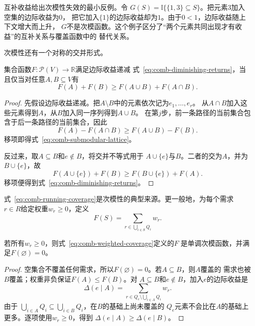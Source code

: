 互补收益给出次模性失效的最小反例。令
$G(S)=\mathbb{I}\{\{1,3\}\subseteq S\}$。把元素$3$加入空集的边际收益为$0$，
把它加入$\{1\}$的边际收益却为$1$。由于$0<1$，边际收益随上下文增大而上升，
$G$不是次模函数。这个例子区分了“两个元素共同出现才有收益”的互补关系与覆盖函数中的
替代关系。

次模性还有一个对称的交并形式。

\begin{theorem}[次模性的两个等价定义]
\label{thm:comb-submodular-equivalence}
集合函数$F:\mathcal{P}(V)\to\mathbb{R}$满足边际收益递减
式~\eqref{eq:comb-diminishing-returns}，当且仅当对任意$A,B\subseteq V$有
\begin{equation}
  F(A)+F(B)\geq F(A\cup B)+F(A\cap B).
  \label{eq:comb-submodular-lattice}
\end{equation}
\end{theorem}

\begin{proof}
先假设边际收益递减。把$A\setminus B$中的元素依次记为$e_1,\ldots,e_r$。
从$A\cap B$加入这些元素得到$A$，从$B$加入同一序列得到$A\cup B$。
在第$j$步，前一条路径的当前集合包含于后一条路径的当前集合，因此
\[
  F(A)-F(A\cap B)
  \geq F(A\cup B)-F(B).
\]
移项即得式~\eqref{eq:comb-submodular-lattice}。

反过来，取$A\subseteq B$和$e\notin B$，将交并不等式用于
$A\cup\{e\}$与$B$。二者的交为$A$，并为$B\cup\{e\}$，故
\[
  F(A\cup\{e\})+F(B)
  \geq F(B\cup\{e\})+F(A).
\]
移项便得到式~\eqref{eq:comb-diminishing-returns}。
\end{proof}

式~\eqref{eq:comb-running-coverage}是次模性的典型来源。更一般地，为每个需求
$r\in R$给定权重$w_r\geq0$，定义
\begin{equation}
  F(S)
  =
  \sum_{r\in\bigcup_{i\in S}Q_i}w_r.
  \label{eq:comb-weighted-coverage}
\end{equation}

\begin{theorem}[非负加权覆盖函数单调且次模]
\label{thm:comb-coverage-submodular}
若所有$w_r\geq0$，则式~\eqref{eq:comb-weighted-coverage}定义的$F$
是单调次模函数，并满足$F(\varnothing)=0$。
\end{theorem}

\begin{proof}
空集合不覆盖任何需求，所以$F(\varnothing)=0$。若$A\subseteq B$，则$A$覆盖的
需求也被$B$覆盖；权重非负保证$F(A)\leq F(B)$。对
$A\subseteq B$和$e\notin B$，加入$e$的边际收益是
\[
  \Delta(e\mid A)
  =
  \sum_{r\in Q_e\setminus\bigcup_{i\in A}Q_i}w_r.
\]
由于
$\bigcup_{i\in A}Q_i\subseteq\bigcup_{i\in B}Q_i$，在$B$的基础上尚未覆盖的
$Q_e$元素不会比在$A$的基础上更多。逐项使用$w_r\geq0$，得到
$\Delta(e\mid A)\geq\Delta(e\mid B)$。
\end{proof}

